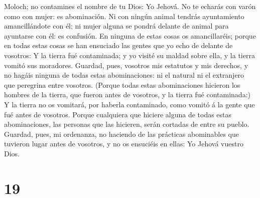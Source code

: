Moloch; no contamines el nombre de tu Dios: Yo Jehová.  No
te echarás con varón como con mujer: es abominación.  Ni
con ningún animal tendrás ayuntamiento amancillándote con él; ni mujer
alguna se pondrá delante de animal para ayuntarse con él: es confusión.
 En ninguna de estas cosas os amancillaréis; porque en
todas estas cosas se han ensuciado las gentes que yo echo de delante de
vosotros:  Y la tierra fué contaminada; y yo visité su
maldad sobre ella, y la tierra vomitó sus moradores. 
Guardad, pues, vosotros mis estatutos y mis derechos, y no hagáis
ninguna de todas estas abominaciones: ni el natural ni el extranjero que
peregrina entre vosotros.  (Porque todas estas
abominaciones hicieron los hombres de la tierra, que fueron antes de
vosotros, y la tierra fué contaminada:)  Y la tierra no os
vomitará, por haberla contaminado, como vomitó á la gente que fué antes
de vosotros.  Porque cualquiera que hiciere alguna de todas
estas abominaciones, las personas que las hicieren, serán cortadas de
entre su pueblo.  Guardad, pues, mi ordenanza, no haciendo
de las prácticas abominables que tuvieron lugar antes de vosotros, y no
os ensuciéis en ellas: Yo Jehová vuestro Dios.

\hypertarget{section-18}{%
\section{19}\label{section-18}}

